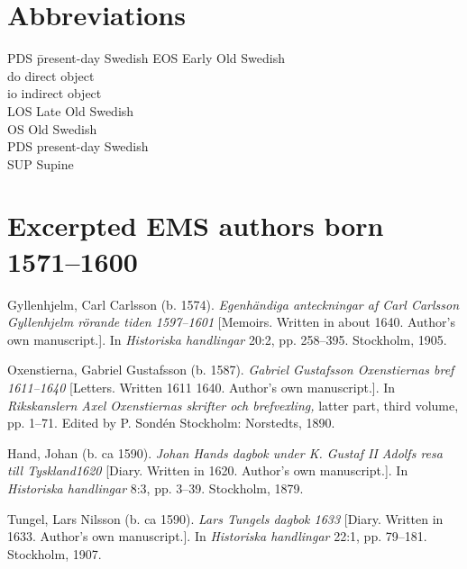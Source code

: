 \documentclass[output=paper]{langscibook}
\begin{document}
\section*{Abbreviations}
\begin{multicols}{2}
\begin{tabbing}
PDS\hspace{1ex} \=    present-day Swedish\kill
EOS \>  Early Old Swedish\\
do  \> direct object\\
io  \> indirect object\\
LOS \>  Late Old Swedish\\
OS  \> Old Swedish\\
PDS \>  present-day Swedish\\
SUP \>  Supine
\end{tabbing}
\end{multicols}


\section*{Excerpted EMS authors born 1571–1600}


Gyllenhjelm, Carl Carlsson (b. 1574). \textit{Egenhändiga anteckningar af Carl Carlsson Gyllenhjelm rörande tiden 1597–1601} [Memoirs. Written in about 1640. Author’s own manuscript.]. In \textit{Historiska handlingar} 20:2, pp. 258–395. Stockholm, 1905. 



Oxenstierna, Gabriel Gustafsson (b. 1587). \textit{Gabriel Gustafsson Oxenstiernas bref 1611–1640} [Letters. Written 1611 1640. Author’s own manuscript.]. In \textit{Rikskanslern Axel Oxenstiernas skrifter och brefvexling,} latter part, third volume, pp. 1–71. Edited by P. Sondén Stockholm: Norstedts, 1890. 



Hand, Johan (b. ca 1590). \textit{Johan Hands dagbok under K. Gustaf II Adolfs resa till Tyskland1620} [Diary. Written in 1620. Author’s own manuscript.]. In \textit{Historiska handlingar} 8:3, pp. 3–39. Stockholm, 1879.



Tungel, Lars Nilsson (b. ca 1590). \textit{Lars Tungels dagbok 1633} [Diary. Written in 1633. Author’s own manuscript.]. In \textit{Historiska handlingar} 22:1, pp. 79–181. Stockholm, 1907.
\end{document}
